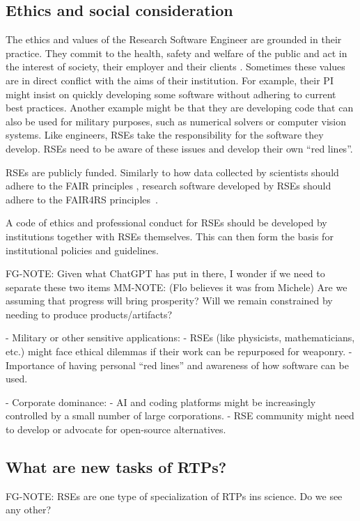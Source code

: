 \documentclass{eceasst}
\begin{document}
\subsection{Ethics and social consideration}
The ethics and values of the Research Software Engineer are grounded in their practice.
They commit to the health, safety and welfare of the public and act in the interest of society, their employer and their clients \cite{Goth2023}.
Sometimes these values are in direct conflict with the aims of their institution.
For example, their PI might insist on quickly developing some software without adhering to current best practices.
Another example might be that they are developing code that can also be used for military purposes, such as numerical solvers or computer vision systems.
Like engineers, RSEs take the responsibility for the software they develop.
RSEs need to be aware of these issues and develop their own ``red lines''.

RSEs are publicly funded.
Similarly to how data collected by scientists should adhere to the FAIR principles \cite{FAIR}, research software developed by RSEs should adhere to the FAIR4RS principles~\cite{FAIR4RS}.

A code of ethics and professional conduct for RSEs should be developed by institutions together with RSEs themselves.
This can then form the basis for institutional policies and guidelines.

\begin{FramedParagraphWithFootnotes}  
FG-NOTE: Given what ChatGPT has put in there, I wonder if we need to separate these two items
MM-NOTE: (Flo believes it was from Michele) Are we assuming that progress will bring prosperity? Will we remain constrained by needing to produce products/artifacts?

- Military or other sensitive applications:
  - RSEs (like physicists, mathematicians, etc.) might face ethical dilemmas if their work can be repurposed for weaponry.
  - Importance of having personal “red lines” and awareness of how software can be used.

- Corporate dominance:
  - AI and coding platforms might be increasingly controlled by a small number of large corporations.
  - RSE community might need to develop or advocate for open-source alternatives.
\end{FramedParagraphWithFootnotes}

\subsection{What are new tasks of RTPs?}
FG-NOTE: RSEs are one type of specialization of RTPs ins science. Do we see any other?
\end{document}

